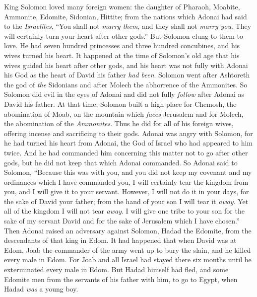 \begin{biblechapter} %
 King Solomon loved many foreign women: the daughter of Pharaoh, Moabite, Ammonite, Edomite, Sidonian, Hittite;
\verse from the nations which Adonai had said to the \textit{Israelites}, “You shall not \textit{marry them}, and they shall not \textit{marry you}. They will certainly turn your heart after other gods.” But Solomon clung to them to love.
\verse He had seven hundred princesses and three hundred concubines, and his wives turned his heart.
 It happened at the time of Solomon’s old age that his wives guided his heart after other gods, and his heart was not fully with Adonai his God as the heart of David his father \textit{had been}.
\verse Solomon went after Ashtoreth the god of \textit{the} Sidonians and after Molech the abhorrence of the Ammonites.
\verse So Solomon did evil in the eyes of Adonai and did not fully \textit{follow} after Adonai as David his father.
\verse At that time, Solomon built a high place for Chemosh, the abomination of Moab, on the mountain which \textit{faces} Jerusalem and for Molech, the abomination of the \textit{Ammonites}.
\verse Thus he did for all of his foreign wives, offering incense and sacrificing to their gods.
 Adonai was angry with Solomon, for he had turned his heart from Adonai, the God of Israel who had appeared to him twice.
\verse And he had commanded him concerning this matter not to go after other gods, but he did not keep that which Adonai commanded.
\verse So Adonai said to Solomon, “Because this was with you, and you did not keep my covenant and my ordinances which I have commanded you, I will certainly tear the kingdom from you, and I will give it to your servant.
\verse However, I will not do it in your days, for the sake of David your father; from the hand of your son I will tear it \textit{away}.
\verse Yet all of the kingdom I will not tear \textit{away}. I will give one tribe to your son for the sake of my servant David and for the sake of Jerusalem which I have chosen.”
\verse Then Adonai raised an adversary against Solomon, Hadad the Edomite, from the descendants of that king in Edom.
\verse It had happened that when David was at Edom, Joab the commander of the army went up to bury the slain, and he killed every male in Edom.
\verse For Joab and all Israel had stayed there six months until he exterminated every male in Edom.
\verse But Hadad himself had fled, and some Edomite men from the servants of his father with him, to go to Egypt, when Hadad \textit{was} a young boy.

\end{biblechapter}

